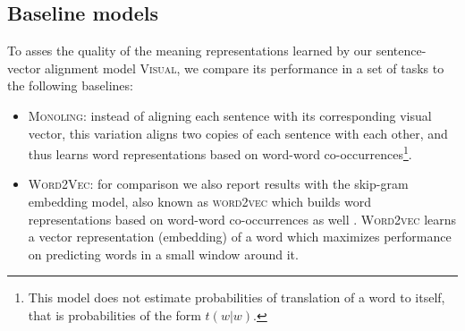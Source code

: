 \subsection{Baseline models}
\label{sec:baseline}

To asses the quality of the meaning representations learned by our
sentence-vector alignment model \textsc{Visual}, we compare its
performance in a set of tasks to the following baselines:
\begin{itemize}
  \item \textsc{Monoling:} instead of aligning each sentence with its
    corresponding visual vector, this variation aligns two copies of
    each sentence with each other, and thus learns word
    representations based on word-word co-occurrences\footnote{This
      model does not estimate probabilities of translation of a word
      to itself, that is probabilities of the form $t(w|w)$.}.
  \item \textsc{Word2Vec:} for comparison we also report results with the skip-gram embedding model, also known as \textsc{word2vec} which builds word
    representations based on word-word co-occurrences as well
    \citep{mikolov2013efficient,mikolov2013distributed}. \textsc{Word2vec}
    learns a vector representation (embedding) of a word which
    maximizes performance on predicting words in a small window around
    it.
\end{itemize}
